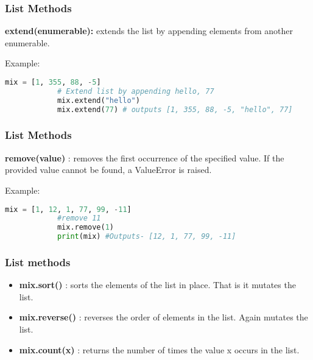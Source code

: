 \documentclass[14pt]{beamer}
\begin{document}
    \begin{frame}[containsverbatim]
        \frametitle{List Methods}
        \textbf{extend(enumerable):} extends the list by appending elements from another enumerable.

        \alert{Example:}
        \begin{lstlisting}[language=Python]
            mix = [1, 355, 88, -5]
            # Extend list by appending hello, 77
            mix.extend("hello")
            mix.extend(77) # outputs [1, 355, 88, -5, "hello", 77]
        \end{lstlisting}
    \end{frame}
    \begin{frame}[containsverbatim]
        \frametitle{List Methods}
        \textbf{remove(value)} : removes the first occurrence of the specified value. If the provided value cannot be found, a ValueError is raised.

        \alert{Example:}
        \begin{lstlisting}[language=Python]
            mix = [1, 12, 1, 77, 99, -11]
            #remove 11
            mix.remove(1)
            print(mix) #Outputs- [12, 1, 77, 99, -11]
        \end{lstlisting}
    \end{frame}
    \begin{frame}
        \frametitle{List methods}
        \begin{itemize}
            \item \textbf{mix.sort()} : sorts the elements of the list in place. That is it mutates the list.
            \item \textbf{mix.reverse()} : reverses the order of elements in the list. Again mutates the list.
            \item \textbf{mix.count(x)} : returns the number of times the value x occurs in the list.
        \end{itemize}
    \end{frame}
\end{document}
